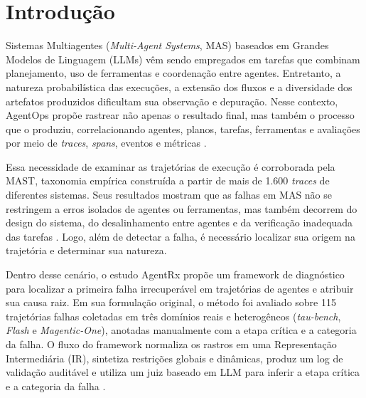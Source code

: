 \documentclass[sigconf]{acmart}
\begin{document}



\maketitle

\section{Introdução}
\label{sec:introducao}

Sistemas Multiagentes (\textit{Multi-Agent Systems}, MAS) baseados em Grandes Modelos de Linguagem (LLMs) vêm sendo
empregados em tarefas que combinam planejamento, uso de ferramentas e coordenação entre agentes. Entretanto, a natureza
probabilística das execuções, a extensão dos fluxos e a diversidade dos artefatos produzidos dificultam sua observação
e depuração. Nesse contexto, AgentOps propõe rastrear não apenas o resultado final, mas também o processo que o
produziu, correlacionando agentes, planos, tarefas, ferramentas e avaliações por meio de \textit{traces},
\textit{spans}, eventos e métricas \cite{dong2024agentops}.

Essa necessidade de examinar as trajetórias de execução é corroborada pela MAST, taxonomia empírica construída a partir
de mais de 1.600 \textit{traces} de diferentes sistemas. Seus resultados mostram que as falhas em MAS não se restringem
a erros isolados de agentes ou ferramentas, mas também decorrem do design do sistema, do desalinhamento entre agentes e
da verificação inadequada das tarefas \cite{cemri2026multi}. Logo, além de detectar a falha, é necessário localizar sua
origem na trajetória e determinar sua natureza.

Dentro desse cenário, o estudo AgentRx propõe um framework de diagnóstico para localizar a primeira falha irrecuperável
em trajetórias de agentes e atribuir sua causa raiz. Em sua formulação original, o método foi avaliado sobre 115
trajetórias falhas coletadas em três domínios reais e heterogêneos (\textit{tau-bench}, \textit{Flash} e
\textit{Magentic-One}), anotadas manualmente com a etapa crítica e a categoria da falha. O fluxo do framework normaliza
os rastros em uma Representação Intermediária (IR), sintetiza restrições globais e dinâmicas, produz um log de
validação auditável e utiliza um juiz baseado em LLM para inferir a etapa crítica e a categoria da falha
\cite{barke2026agentrx}.
\end{document}
